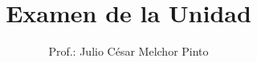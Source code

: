 \documentclass[12pt]{evalua}
\title{Examen de la Unidad}
\author{Prof.: Julio César Melchor Pinto}
\begin{document}
{\small
\begin{multicols}{2}
    
    
    
    
    
\end{multicols}
% 
% 
}
\begin{questions}
    \begin{multicols}{2}
        
    \end{multicols}
    \begin{multicols}{2}
        
    \end{multicols}
    \newpage
    
    
    \newpage
    
    \newpage
    
\end{questions}
\end{document}
